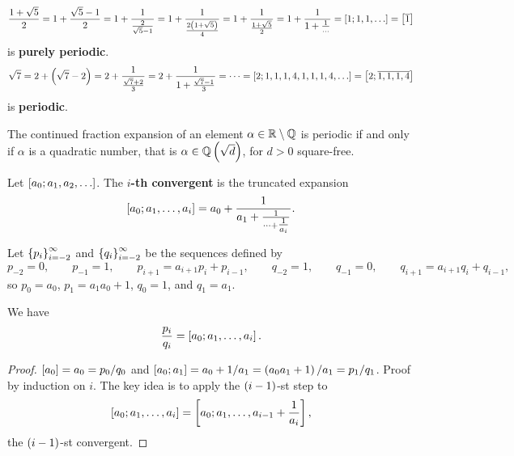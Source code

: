 \begin{example*}
$$ \dfrac{1 + \sqrt{5}}{2} = 1 + \dfrac{\sqrt{5} - 1}{2} = 1 + \dfrac{1}{\tfrac{2}{\sqrt{5} - 1}} = 1 + \dfrac{1}{\tfrac{2\rb{1 + \sqrt{5}}}{4}} = 1 + \dfrac{1}{\tfrac{1 + \sqrt{5}}{2}} = 1 + \dfrac{1}{1 + \tfrac{1}{\dots}} = \sb{1; 1, 1, \dots} = \sb{\overline{1}} $$
is \textbf{purely periodic}.
$$ \sqrt{7} = 2 + \rb{\sqrt{7} - 2} = 2 + \dfrac{1}{\tfrac{\sqrt{7} + 2}{3}} = 2 + \dfrac{1}{1 + \tfrac{\sqrt{7} - 1}{3}} = \dots = \sb{2; 1, 1, 1, 4, 1, 1, 1, 4, \dots} = \sb{2; \overline{1, 1, 1, 4}} $$
is \textbf{periodic}.
\end{example*}

\begin{theorem}
The continued fraction expansion of an element $ \alpha \in \R \setminus \Q $ is periodic if and only if $ \alpha $ is a quadratic number, that is $ \alpha \in \Q\rb{\sqrt{d}} $, for $ d > 0 $ square-free.
\end{theorem}


\begin{definition}
Let $ \sb{a_0; a_1, a_2, \dots} $. The \textbf{$ i $-th convergent} is the truncated expansion
$$ \sb{a_0; a_1, \dots, a_i} = a_0 + \dfrac{1}{a_1 + \tfrac{1}{\dots + \tfrac{1}{a_i}}}. $$
\end{definition}

\begin{definition}
Let $ \cb{p_i}_{i = -2}^\infty $ and $ \cb{q_i}_{i = -2}^\infty $ be the sequences defined by
$$ p_{-2} = 0, \qquad p_{-1} = 1, \qquad p_{i + 1} = a_{i + 1}p_i + p_{i - 1}, \qquad q_{-2} = 1, \qquad q_{-1} = 0, \qquad q_{i + 1} = a_{i + 1}q_i + q_{i - 1}, $$
so $ p_0 = a_0 $, $ p_1 = a_1a_0 + 1 $, $ q_0 = 1 $, and $ q_1 = a_1 $.
\end{definition}

\begin{lemma}
We have
$$ \dfrac{p_i}{q_i} = \sb{a_0; a_1, \dots, a_i}. $$
\end{lemma}

\begin{proof}
$ \sb{a_0} = a_0 = p_0 / q_0 $ and $ \sb{a_0; a_1} = a_0 + 1 / a_1 = \rb{a_0a_1 + 1} / a_1 = p_1 / q_1 $. Proof by induction on $ i $. The key idea is to apply the $ \rb{i - 1} $-st step to
$$ \sb{a_0; a_1, \dots, a_i} = \sb{a_0; a_1, \dots, a_{i - 1} + \dfrac{1}{a_i}}, $$
the $ \rb{i - 1} $-st convergent.
\end{proof}

